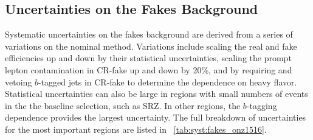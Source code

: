 
\subsection{Uncertainties on the Fakes Background}
\label{sec:uncert_fakes}

Systematic uncertainties on the fakes background are derived from a series of variations on the nominal method.  Variations include scaling the real and fake efficiencies up and down by their statistical uncertainties, scaling the prompt lepton contamination in CR-fake up and down by 20\%, and by requiring and vetoing $b$-tagged jets in CR-fake to determine the dependence on heavy flavor. 
Statistical uncertainties can also be large in regions with small numbers of events in the the baseline selection, such as SRZ. In other regions, the $b$-tagging dependence provides the largest uncertainty. The full breakdown of uncertainties for the most important regions are listed in ~\autoref{tab:syst:fakes_onz1516}.


